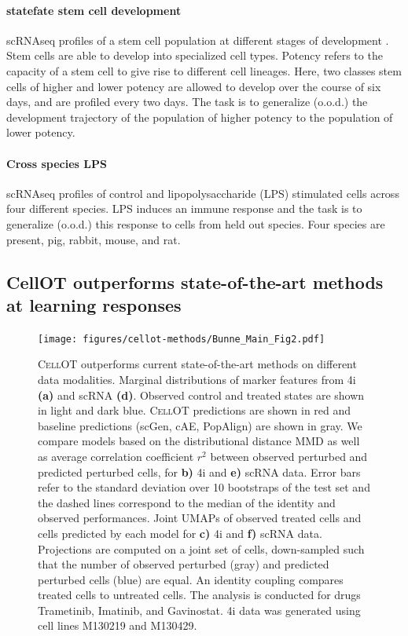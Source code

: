 \paragraph{statefate stem cell development}
scRNAseq profiles of a stem cell population at different stages of development \cite{weinreb2020}.
Stem cells are able to develop into specialized cell types.
Potency refers to the capacity of a stem cell to give rise to different cell lineages.
Here, two classes stem cells of higher and lower potency are allowed to develop over the course of six days, and are profiled every two days.
The task is to generalize (o.o.d.) the development trajectory of the population of higher potency to the population of lower potency.

\paragraph{Cross species LPS}
scRNAseq profiles of control and lipopolysaccharide (LPS) stimulated cells across four different species.
LPS induces an immune response and 
the task is to generalize (o.o.d.) this response to cells from held out species.
Four species are present, pig, rabbit, mouse, and rat. 

\subsection{CellOT outperforms state-of-the-art methods at learning responses}

\begin{figure}
  \begin{center}
    \texttt{[image: figures/cellot-methods/Bunne\_Main\_Fig2.pdf]}
  \end{center}
  \caption{
  \textsc{CellOT} outperforms current state-of-the-art methods on different data modalities.
  Marginal distributions of marker features from  4i \textbf{(a)} and scRNA \textbf{(d)}.
  Observed control and treated states are shown in light and dark blue.
  \textsc{CellOT} predictions are shown in red and baseline predictions (scGen, cAE, PopAlign) are shown in gray.
  We compare models based on the distributional distance MMD as well as average correlation coefficient $r^2$ between observed perturbed and predicted perturbed cells, for \textbf{b)} 4i and \textbf{e)} scRNA data. Error bars refer to the standard deviation over 10 bootstraps of the test set and the dashed lines correspond to the median of the identity and observed performances. Joint UMAPs of observed treated cells and cells predicted by each model for \textbf{c)} 4i and \textbf{f)} scRNA data. Projections are computed on a joint set of cells, down-sampled such that the number of observed perturbed (gray) and predicted perturbed cells (blue) are equal. An identity coupling compares treated cells to untreated cells. The analysis is conducted for drugs Trametinib, Imatinib, and Gavinostat. 4i data was generated using cell lines M130219 and M130429.}

  \label{fig:cellot-main-marginals}
\end{figure}

